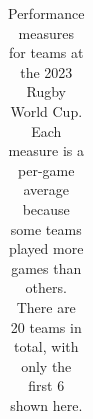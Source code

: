 \documentclass[
  letterpaper,
  DIV=11,
  numbers=noendperiod]{scrreprt}
\begin{document}
\begin{longtable}[]{@{}
  >{\raggedright\arraybackslash}p{}
  >{\raggedright\arraybackslash}p{}
  >{\raggedleft\arraybackslash}p{}
  >{\raggedleft\arraybackslash}p{}
  >{\raggedleft\arraybackslash}p{}
  >{\raggedleft\arraybackslash}p{}
  >{\raggedleft\arraybackslash}p{}
  >{\raggedleft\arraybackslash}p{}
  >{\raggedleft\arraybackslash}p{}
  >{\raggedleft\arraybackslash}p{}
  >{\raggedleft\arraybackslash}p{}@{}}

\caption{\label{tbl-rwc-2023}Performance measures for teams at the 2023
Rugby World Cup. Each measure is a per-game average because some teams
played more games than others. There are 20 teams in total, with only
the first 6 shown here.}

\tabularnewline


\end{longtable}
\end{document}
